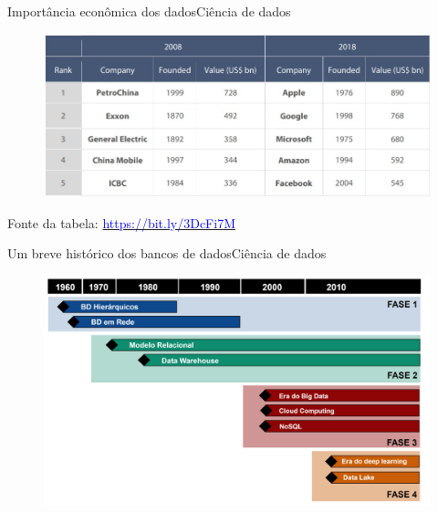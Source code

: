 \documentclass[t]{beamer}
\begin{document}

\begin{ftst}{Importância econômica dos dados}{Ciência de dados}
\begin{figure}
    \centering
    \includegraphics[scale=0.5]{Figuras/slide00_05.jpg}
\end{figure}
\vone
\vone
\vone
\scriptsize
Fonte da tabela: \href{https://bit.ly/3DcFi7M}{\textcolor{blue}{https://bit.ly/3DcFi7M}}

\end{ftst}


\begin{ftst}{Um breve histórico dos bancos de dados}{Ciência de dados}
\begin{figure}
    \centering
    \includegraphics[scale=0.1]{Figuras/slide00_09.png}
\end{figure}
\end{ftst}
\end{document}
